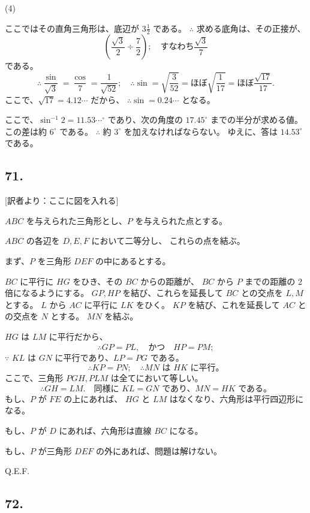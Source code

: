 (4)

ここではその直角三角形は、底辺が $3 \frac{1}{2}$ である。
$\therefore$ 求める底角は、その正接が、
\[
\left( \frac{\sqrt{3}}{2} \div \frac{7}{2} \right);
\quad
\mbox{すなわち}
\frac{\sqrt{3}}{7}
\]
である。
\[
\therefore
\frac{\sin}{\sqrt{3}}
= \frac{\cos}{7} = \frac{1}{\sqrt{52}};
\quad
\therefore
\sin = \sqrt{\frac{3}{52}}
= \mbox{ほぼ} \sqrt{\frac{1}{17}}
= \mbox{ほぼ} \frac{\sqrt{17}}{17}.
\]
ここで、$\sqrt{17} = 4.12 \cdots$ だから、
$\therefore \sin = 0.24\cdots$ となる。

ここで、$\sin^{-1} 2 = 11.53 \cdots^\circ$
であり、次の角度の $17.45^\circ$ までの半分が求める値。
この差は約 $6^\circ$ である。
$\therefore$ 約 $3^\circ$ を加えなければならない。
ゆえに、答は $14.53^\circ$ である。


\subsection*{71.}

[訳者より：ここに図を入れる] 

$ABC$ を与えられた三角形とし、$P$ を与えられた点とする。

$ABC$ の各辺を $D, E, F$ において二等分し、
これらの点を結ぶ。

まず、$P$ を三角形 $DEF$ の中にあるとする。

$BC$ に平行に $HG$ をひき、その $BC$ からの距離が、
$BC$ から $P$ までの距離の 2 倍になるようにする。
$GP, HP$ を結び、これらを延長して $BC$ との交点を $L, M$ とする。
$L$ から $AC$ に平行に $LK$ をひく。
$KP$ を結び、これを延長して $AC$ との交点を $N$ とする。
$MN$ を結ぶ。

$HG$ は $LM$ に平行だから、
\[
\therefore
GP = PL,
\quad
\mbox{かつ}
\quad HP = PM;
\]
$\because$ $KL$ は $GN$ に平行であり、$LP = PG$ である。
\[
\therefore
KP = PN;
\quad
\therefore
\mbox{$MN$ は $HK$ に平行。}
\]
ここで、三角形 $PGH, PLM$ は全てにおいて等しい。
\[
\therefore
GH = LM.
\quad
\mbox{同様に $KL = GN$ であり、$MN = HK$ である。}
\]
もし、$P$ が $FE$ の上にあれば、
$HG$ と $LM$ はなくなり、六角形は平行四辺形になる。

もし、$P$ が $D$ にあれば、六角形は直線 $BC$ になる。

もし、$P$ が三角形 $DEF$ の外にあれば、問題は解けない。

Q.E.F.


\subsection*{72.}

